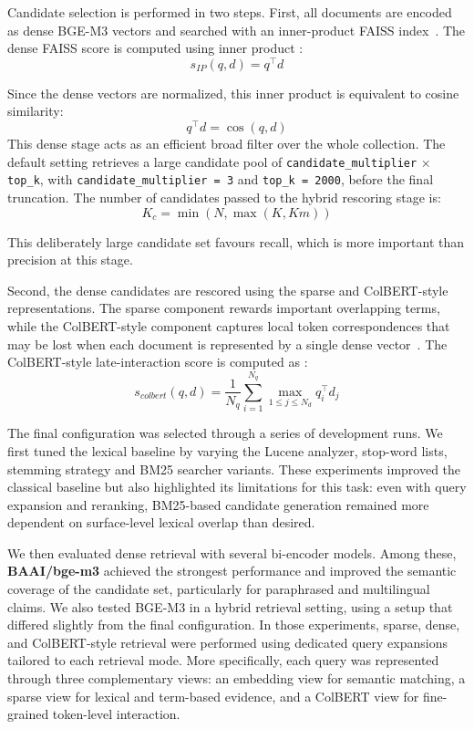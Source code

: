 Candidate selection is performed in two steps. First, all documents are encoded as dense BGE-M3 vectors and searched with an inner-product FAISS index~\cite{faiss_documentation}. 
The dense FAISS score is computed using inner product \cite{faiss_metrics}:
\[
s_{IP}(q,d)=q^\top d
\]

Since the dense vectors are normalized, this inner product is equivalent to cosine similarity:
\[
q^\top d=\cos(q,d)
\]
This dense stage acts as an efficient broad filter over the whole collection. The default setting retrieves a large candidate pool of \texttt{candidate\_multiplier} $\times$ \texttt{top\_k}, with \texttt{candidate\_multiplier = 3} and \texttt{top\_k = 2000}, before the final truncation. 
The number of candidates passed to the hybrid rescoring stage is:
\[
K_c=\min(N,\max(K,Km))
\]

This deliberately large candidate set favours recall, which is more important than precision at this stage.

Second, the dense candidates are rescored using the sparse and ColBERT-style representations. The sparse component rewards important overlapping terms, while the ColBERT-style component captures local token correspondences that may be lost when each document is represented by a single dense vector~\cite{KhattabZaharia2020}.
The ColBERT-style late-interaction score is computed as \cite{khattab2020colbert}:
\[
s_{colbert}(q,d)=\frac{1}{N_q}\sum_{i=1}^{N_q}\max_{1\le j\le N_d} q_i^\top d_j
\]

The final configuration was selected through a series of development runs. We first tuned the lexical baseline by varying the Lucene analyzer, stop-word lists, stemming strategy and BM25 searcher variants. These experiments improved the classical baseline but also highlighted its limitations for this task: even with query expansion and reranking, BM25-based candidate generation remained more dependent on surface-level lexical overlap than desired.

We then evaluated dense retrieval with several bi-encoder models. Among these, \textbf{BAAI/bge-m3} achieved the strongest performance and improved the semantic coverage of the candidate set, particularly for paraphrased and multilingual claims. We also tested BGE-M3 in a hybrid retrieval setting, using a setup that differed slightly from the final configuration. In those experiments, sparse, dense, and ColBERT-style retrieval were performed using dedicated query expansions tailored to each retrieval mode. More specifically, each query was represented through three complementary views: an embedding view for semantic matching, a sparse view for lexical and term-based evidence, and a ColBERT view for fine-grained token-level interaction.


